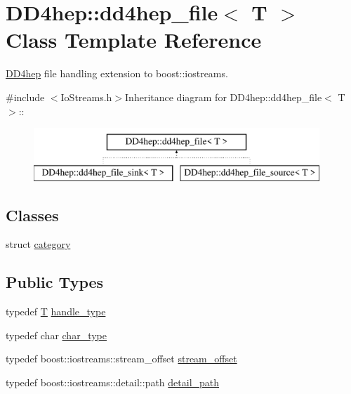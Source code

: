 \hypertarget{class_d_d4hep_1_1dd4hep__file}{
\section{DD4hep::dd4hep\_\-file$<$ T $>$ Class Template Reference}
\label{class_d_d4hep_1_1dd4hep__file}
}


\hyperlink{namespace_d_d4hep}{DD4hep} file handling extension to boost::iostreams.  


{\ttfamily \#include $<$IoStreams.h$>$}Inheritance diagram for DD4hep::dd4hep\_\-file$<$ T $>$::\begin{figure}[H]
\begin{center}
\leavevmode
\includegraphics[height=2cm]{class_d_d4hep_1_1dd4hep__file}
\end{center}
\end{figure}
\subsection*{Classes}
\begin{DoxyCompactItemize}
\item 
struct \hyperlink{struct_d_d4hep_1_1dd4hep__file_1_1category}{category}
\end{DoxyCompactItemize}
\subsection*{Public Types}
\begin{DoxyCompactItemize}
\item 
typedef \hyperlink{class_t}{T} \hyperlink{class_d_d4hep_1_1dd4hep__file_a4d79f8d433cd7831ff818691424cd6fc}{handle\_\-type}
\item 
typedef char \hyperlink{class_d_d4hep_1_1dd4hep__file_aef4242f7f2fe15a59f7bf7a8f6ba24d5}{char\_\-type}
\item 
typedef boost::iostreams::stream\_\-offset \hyperlink{class_d_d4hep_1_1dd4hep__file_a28e1531542193871075e8b7f47818113}{stream\_\-offset}
\item 
typedef boost::iostreams::detail::path \hyperlink{class_d_d4hep_1_1dd4hep__file_a1dc19fee9af970892ad53dd7eadc5426}{detail\_\-path}
\end{DoxyCompactItemize}
